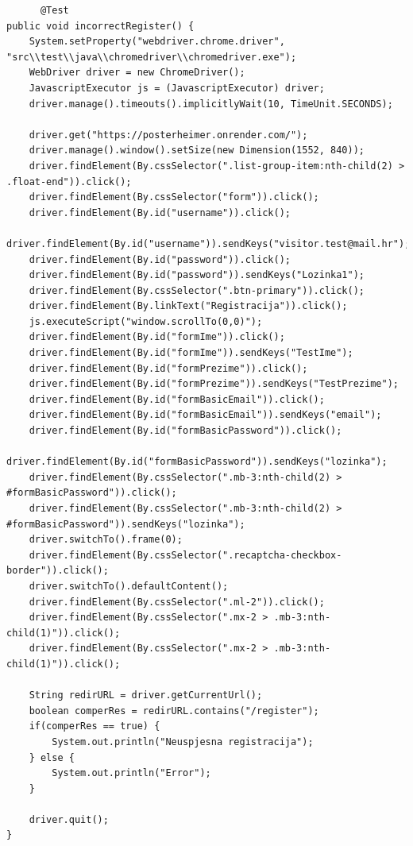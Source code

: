 			\begin{lstlisting}
	  @Test
public void incorrectRegister() {
	System.setProperty("webdriver.chrome.driver", "src\\test\\java\\chromedriver\\chromedriver.exe");
	WebDriver driver = new ChromeDriver();
	JavascriptExecutor js = (JavascriptExecutor) driver;
	driver.manage().timeouts().implicitlyWait(10, TimeUnit.SECONDS);
	
	driver.get("https://posterheimer.onrender.com/");
	driver.manage().window().setSize(new Dimension(1552, 840));
	driver.findElement(By.cssSelector(".list-group-item:nth-child(2) > .float-end")).click();
	driver.findElement(By.cssSelector("form")).click();
	driver.findElement(By.id("username")).click();
	driver.findElement(By.id("username")).sendKeys("visitor.test@mail.hr");
	driver.findElement(By.id("password")).click();
	driver.findElement(By.id("password")).sendKeys("Lozinka1");
	driver.findElement(By.cssSelector(".btn-primary")).click();
	driver.findElement(By.linkText("Registracija")).click();
	js.executeScript("window.scrollTo(0,0)");
	driver.findElement(By.id("formIme")).click();
	driver.findElement(By.id("formIme")).sendKeys("TestIme");
	driver.findElement(By.id("formPrezime")).click();
	driver.findElement(By.id("formPrezime")).sendKeys("TestPrezime");
	driver.findElement(By.id("formBasicEmail")).click();
	driver.findElement(By.id("formBasicEmail")).sendKeys("email");
	driver.findElement(By.id("formBasicPassword")).click();
	driver.findElement(By.id("formBasicPassword")).sendKeys("lozinka");
	driver.findElement(By.cssSelector(".mb-3:nth-child(2) > #formBasicPassword")).click();
	driver.findElement(By.cssSelector(".mb-3:nth-child(2) > #formBasicPassword")).sendKeys("lozinka");
	driver.switchTo().frame(0);
	driver.findElement(By.cssSelector(".recaptcha-checkbox-border")).click();
	driver.switchTo().defaultContent();
	driver.findElement(By.cssSelector(".ml-2")).click();
	driver.findElement(By.cssSelector(".mx-2 > .mb-3:nth-child(1)")).click();
	driver.findElement(By.cssSelector(".mx-2 > .mb-3:nth-child(1)")).click();
	
	String redirURL = driver.getCurrentUrl();
	boolean comperRes = redirURL.contains("/register");
	if(comperRes == true) {
		System.out.println("Neuspjesna registracija");
	} else {
		System.out.println("Error");
	}
	
	driver.quit();
}	  
			\end{lstlisting}
			
